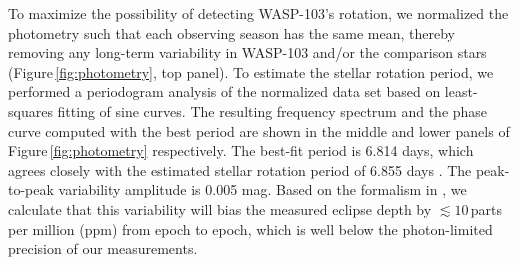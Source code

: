 \documentclass[twocolumn, trackchanges]{aastex61}
\begin{document}

To maximize the possibility of detecting WASP-103's rotation, we normalized the photometry such that each observing season has the same mean, thereby removing any long-term variability in WASP-103 and/or the comparison stars (Figure\,\ref{fig:photometry}, top panel).  To estimate the stellar rotation period, we performed a periodogram analysis of the normalized data set based on least-squares fitting of sine curves.  The resulting frequency spectrum and the phase curve computed with the best period are shown in the middle and lower panels of Figure\,\ref{fig:photometry} respectively. The best-fit period is 6.814 days, which agrees closely with the estimated stellar rotation period of 6.855 days \citep[based on the projected stellar rotation velocity and stellar radius reported in][]{gillon14}. The peak-to-peak variability amplitude is 0.005 mag.  Based on the formalism in \cite{zellem17}, we calculate that this variability will bias the measured eclipse depth by $\lesssim10$\,parts per million (ppm) from epoch to epoch, which is well below the photon-limited precision of our measurements.
\end{document}
